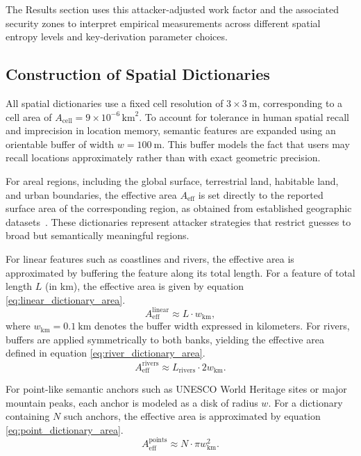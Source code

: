 \documentclass[journal,article,submit,pdftex,moreauthors]{Definitions/mdpi}
\begin{document}
The Results section uses this attacker-adjusted work factor and the associated security zones to interpret empirical measurements across different spatial entropy levels and key-derivation parameter choices.

\subsection{Construction of Spatial Dictionaries}

All spatial dictionaries use a fixed cell resolution of $3\times3~\text{m}$, corresponding to a cell area of $A_{\text{cell}} = 9 \times 10^{-6}\,\text{km}^2$. To account for tolerance in human spatial recall and imprecision in location memory, semantic features are expanded using an orientable buffer of width $w = 100~\text{m}$. This buffer models the fact that users may recall locations approximately rather than with exact geometric precision.

For areal regions, including the global surface, terrestrial land, habitable land, and urban boundaries, the effective area $A_{\text{eff}}$ is set directly to the reported surface area of the corresponding region, as obtained from established geographic datasets~\cite{FAO_GLC,Venter2016}. These dictionaries represent attacker strategies that restrict guesses to broad but semantically meaningful regions.

For linear features such as coastlines and rivers, the effective area is approximated by buffering the feature along its total length. For a feature of total length $L$ (in km), the effective area is given by equation \ref{eq:linear_dictionary_area}.
\begin{equation}
A_{\text{eff}}^{\text{linear}} \approx L \cdot w_{\text{km}},
\label{eq:linear_dictionary_area}
\end{equation}
where $w_{\text{km}} = 0.1~\text{km}$ denotes the buffer width expressed in kilometers. For rivers, buffers are applied symmetrically to both banks, yielding the effective area defined in equation \ref{eq:river_dictionary_area}.
\begin{equation}
A_{\text{eff}}^{\text{rivers}} \approx L_{\text{rivers}} \cdot 2 w_{\text{km}}.
\label{eq:river_dictionary_area}
\end{equation}

For point-like semantic anchors such as UNESCO World Heritage sites or major mountain peaks, each anchor is modeled as a disk of radius $w$. For a dictionary containing $N$ such anchors, the effective area is approximated by equation \ref{eq:point_dictionary_area}.
\begin{equation}
A_{\text{eff}}^{\text{points}} \approx N \cdot \pi w_{\text{km}}^2.
\label{eq:point_dictionary_area}
\end{equation}
\end{document}
